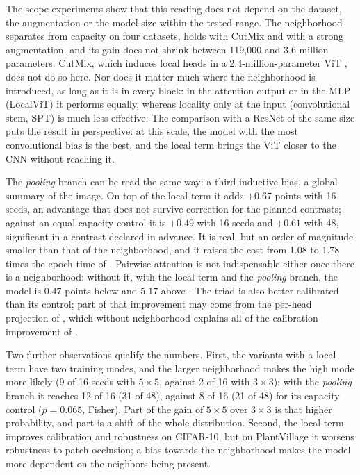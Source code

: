 The scope experiments show that this reading does not depend on the dataset, the augmentation or the model size within the tested range. The neighborhood separates from capacity on four datasets, holds with CutMix and with a strong augmentation, and its gain does not shrink between 119,000 and 3.6 million parameters. CutMix, which induces local heads in a 2.4-million-parameter ViT \cite{santiago2026inducing}, does not do so here. Nor does it matter much where the neighborhood is introduced, as long as it is in every block: in the attention output or in the MLP (LocalViT) it performs equally, whereas locality only at the input (convolutional stem, SPT) is much less effective. The comparison with a ResNet of the same size puts the result in perspective: at this scale, the model with the most convolutional bias is the best, and the local term brings the ViT closer to the CNN without reaching it.

The \emph{pooling} branch can be read the same way: a third inductive bias, a global summary of the image. On top of the local term it adds $+0.67$ points with 16 seeds, an advantage that does not survive correction for the planned contrasts; against an equal-capacity control it is $+0.49$ with 16 seeds and $+0.61$ with 48, significant in a contrast declared in advance. It is real, but an order of magnitude smaller than that of the neighborhood, and it raises the cost from 1.08 to 1.78 times the epoch time of . Pairwise attention is not indispensable either once there is a neighborhood: without it, with the local term and the \emph{pooling} branch, the model is $0.47$ points below  and $5.17$ above . The triad is also better calibrated than its control; part of that improvement may come from the per-head projection of , which without neighborhood explains all of the calibration improvement of .

Two further observations qualify the numbers. First, the variants with a local term have two training modes, and the larger neighborhood makes the high mode more likely (9 of 16 seeds with $5\times5$, against 2 of 16 with $3\times3$); with the \emph{pooling} branch it reaches 12 of 16 (31 of 48), against 8 of 16 (21 of 48) for its capacity control ($p=0.065$, Fisher). Part of the gain of $5\times5$ over $3\times3$ is that higher probability, and part is a shift of the whole distribution. Second, the local term improves calibration and robustness on CIFAR-10, but on PlantVillage it worsens robustness to patch occlusion; a bias towards the neighborhood makes the model more dependent on the neighbors being present.

